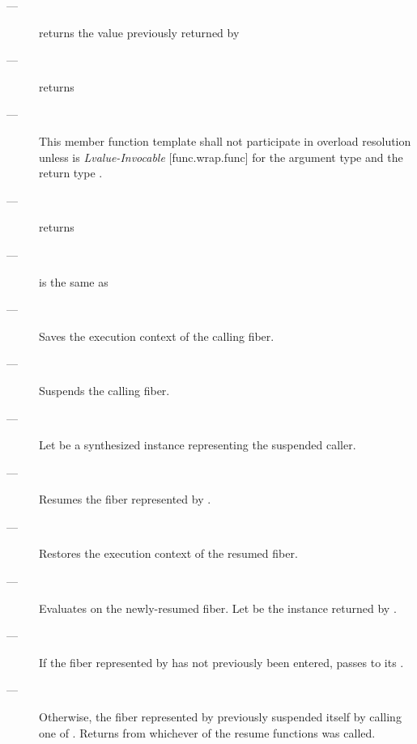 \postcond
\begin{description}
    \item[---]  returns the value previously returned by 
    \item[---]  returns 
\end{description}


\constraints
\begin{description}
    \item[---] This member function template shall not participate in overload
               resolution unless  is \emph{Lvalue-Invocable} [func.wrap.func]
               for the argument type  and the return
               type \fiber.\\
\end{description}

\requires
\begin{description}
    \item[---]  returns 
    \item[---] \currthread is the same as \lastthread
\end{description}

\effects
\begin{description}
    \item[---] Saves the execution context of the calling fiber.
    \item[---] Suspends the calling fiber.
    \item[---] Let  be a synthesized \fiber instance representing
               the suspended caller.
    \item[---] Resumes the fiber represented by .
    \item[---] Restores the execution context of the resumed fiber.
    \item[---] Evaluates  on the newly-resumed fiber.
               Let  be the \fiber instance returned by .
    \item[---] If the fiber represented by  has not previously been
               entered, passes  to its \entryfn.
    \item[---] Otherwise, the fiber represented by  previously
               suspended itself by calling one of \allresume.
               Returns  from whichever of the resume functions
               was called.
\end{description}


